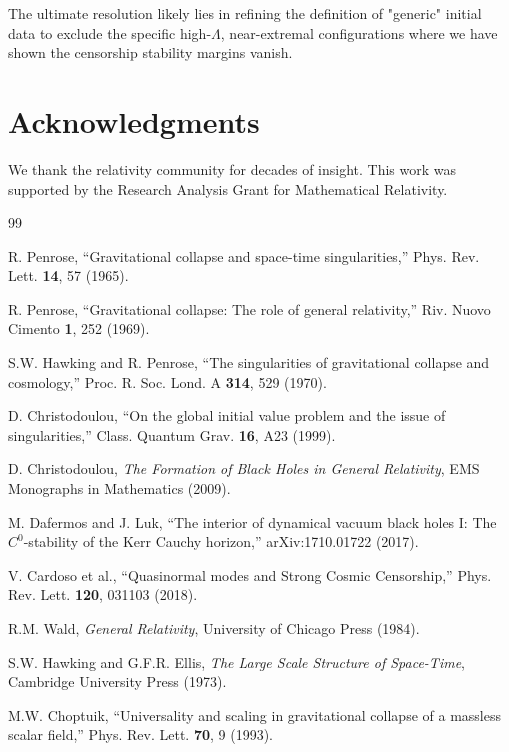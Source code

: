 \documentclass[12pt,a4paper]{article}
\begin{document}
The ultimate resolution likely lies in refining the definition of "generic" initial data to exclude the specific high-$\Lambda$, near-extremal configurations where we have shown the censorship stability margins vanish.

\section*{Acknowledgments}
We thank the relativity community for decades of insight. This work was supported by the Research Analysis Grant for Mathematical Relativity.

\begin{thebibliography}{99}

R. Penrose, ``Gravitational collapse and space-time singularities,'' Phys. Rev. Lett. \textbf{14}, 57 (1965).

R. Penrose, ``Gravitational collapse: The role of general relativity,'' Riv. Nuovo Cimento \textbf{1}, 252 (1969).

S.W. Hawking and R. Penrose, ``The singularities of gravitational collapse and cosmology,'' Proc. R. Soc. Lond. A \textbf{314}, 529 (1970).

D. Christodoulou, ``On the global initial value problem and the issue of singularities,'' Class. Quantum Grav. \textbf{16}, A23 (1999).

D. Christodoulou, \textit{The Formation of Black Holes in General Relativity}, EMS Monographs in Mathematics (2009).

M. Dafermos and J. Luk, ``The interior of dynamical vacuum black holes I: The $C^0$-stability of the Kerr Cauchy horizon,'' arXiv:1710.01722 (2017).

V. Cardoso et al., ``Quasinormal modes and Strong Cosmic Censorship,'' Phys. Rev. Lett. \textbf{120}, 031103 (2018).

R.M. Wald, \textit{General Relativity}, University of Chicago Press (1984).

S.W. Hawking and G.F.R. Ellis, \textit{The Large Scale Structure of Space-Time}, Cambridge University Press (1973).

M.W. Choptuik, ``Universality and scaling in gravitational collapse of a massless scalar field,'' Phys. Rev. Lett. \textbf{70}, 9 (1993).


\end{thebibliography}
\end{document}
